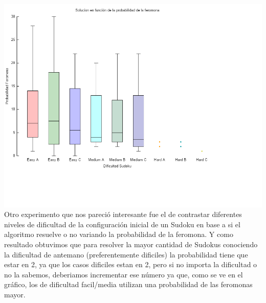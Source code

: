 \includegraphics[scale=0.5]{imgs/solucion_hormigas_proba.png}
Otro experimento que nos pareció interesante fue el de contrastar diferentes niveles de dificultad de la configuración inicial de un Sudoku en base a si el algoritmo resuelve o no variando la probabilidad de la feromona. Y como resultado obtuvimos que para resolver la mayor cantidad de Sudokus conociendo la dificultad de antemano (preferentemente dificiles) la probabilidad tiene que estar en 2, ya que los casos dificiles estan en 2, pero si no importa la dificultad o no la sabemos, deberiamos incrementar ese número ya que, como se ve en el gráfico, los de dificultad facil/media utilizan una probabilidad de las feromonas mayor.

